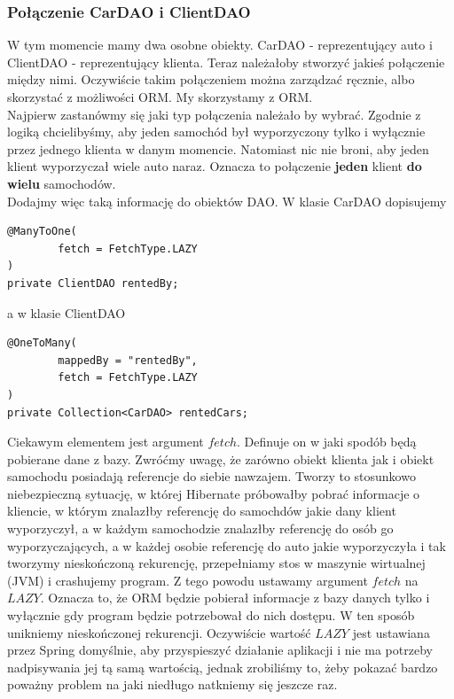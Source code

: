\documentclass{article}
\begin{document}
        \subsubsection{Połączenie CarDAO i ClientDAO}
            W tym momencie mamy dwa osobne obiekty. CarDAO - reprezentujący auto i ClientDAO - reprezentujący klienta. Teraz należałoby stworzyć jakieś połączenie między nimi. Oczywiście takim połączeniem można zarządzać ręcznie, albo skorzystać z możliwości ORM. My skorzystamy z ORM. \\
            Najpierw zastanówmy się jaki typ połączenia należało by wybrać. Zgodnie z logiką chcielibyśmy, aby jeden samochód był wyporzyczony tylko i wyłącznie przez jednego klienta w danym momencie. Natomiast nic nie broni, aby jeden klient wyporzyczał wiele auto naraz. Oznacza to połączenie \textbf{jeden} klient \textbf{do wielu} samochodów. \\
            Dodajmy więc taką informację do obiektów DAO. W klasie CarDAO dopisujemy
            \begin{verbatim}
@ManyToOne(
        fetch = FetchType.LAZY
)
private ClientDAO rentedBy;
            \end{verbatim}
            a w klasie ClientDAO
            \begin{verbatim}
@OneToMany(
        mappedBy = "rentedBy",
        fetch = FetchType.LAZY
)
private Collection<CarDAO> rentedCars;
            \end{verbatim}
            Ciekawym elementem jest argument $fetch$. Definuje on  w jaki spodób będą pobierane dane z bazy. Zwróćmy uwagę, że zarówno obiekt klienta jak i obiekt samochodu posiadają referencje do siebie nawzajem. Tworzy to stosunkowo niebezpieczną sytuację, w której Hibernate próbowałby pobrać informacje o kliencie, w którym znalazłby referencję do samochdów jakie dany klient wyporzyczył, a w każdym samochodzie znalazłby referencję do osób go wyporzyczających, a w każdej osobie referencję do auto jakie wyporzyczyła i tak tworzymy nieskończoną rekurencję, przepełniamy stos w maszynie wirtualnej (JVM) i crashujemy program. Z tego powodu ustawamy argument $fetch$ na $LAZY$. Oznacza to, że ORM będzie pobierał informacje z bazy danych tylko i wyłącznie gdy program będzie potrzebował do nich dostępu. W ten sposób unikniemy nieskończonej rekurencji. Oczywiście wartość $LAZY$ jest ustawiana przez Spring domyślnie, aby przyspieszyć działanie aplikacji i nie ma potrzeby nadpisywania jej tą samą wartością, jednak zrobiliśmy to, żeby pokazać bardzo poważny problem na jaki niedługo natkniemy się jeszcze raz.
\end{document}
